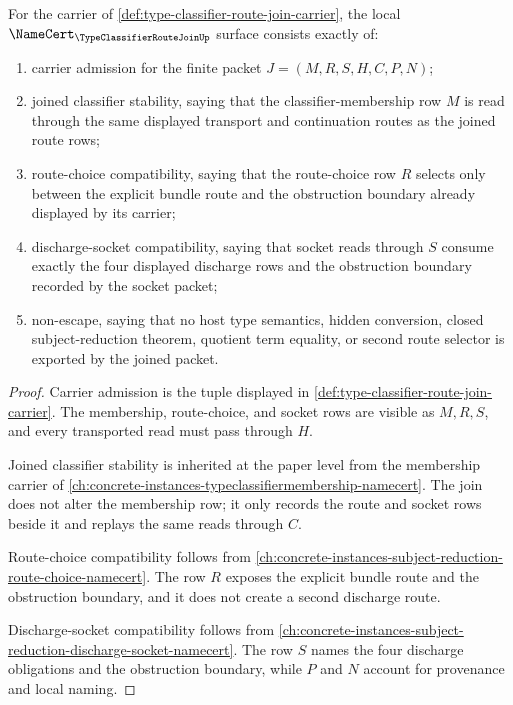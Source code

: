 \begin{theorem}
\label{thm:type-classifier-route-join-namecert-obligations}
For the carrier of \autoref{def:type-classifier-route-join-carrier}, the local $\NameCert_{\TypeClassifierRouteJoinUp}$ surface consists exactly of:
\begin{enumerate}
\item carrier admission for the finite packet $J=(M,R,S,H,C,P,N)$;
\item joined classifier stability, saying that the classifier-membership row $M$ is read through the same displayed transport and continuation routes as the joined route rows;
\item route-choice compatibility, saying that the route-choice row $R$ selects only between the explicit bundle route and the obstruction boundary already displayed by its carrier;
\item discharge-socket compatibility, saying that socket reads through $S$ consume exactly the four displayed discharge rows and the obstruction boundary recorded by the socket packet;
\item non-escape, saying that no host type semantics, hidden conversion, closed subject-reduction theorem, quotient term equality, or second route selector is exported by the joined packet.
\end{enumerate}
\end{theorem}
\begin{proof}
Carrier admission is the tuple displayed in \autoref{def:type-classifier-route-join-carrier}. The membership, route-choice, and socket rows are visible as $M,R,S$, and every transported read must pass through $H$.

Joined classifier stability is inherited at the paper level from the membership carrier of \autoref{ch:concrete-instances-typeclassifiermembership-namecert}. The join does not alter the membership row; it only records the route and socket rows beside it and replays the same reads through $C$.

Route-choice compatibility follows from \autoref{ch:concrete-instances-subject-reduction-route-choice-namecert}. The row $R$ exposes the explicit bundle route and the obstruction boundary, and it does not create a second discharge route.

Discharge-socket compatibility follows from \autoref{ch:concrete-instances-subject-reduction-discharge-socket-namecert}. The row $S$ names the four discharge obligations and the obstruction boundary, while $P$ and $N$ account for provenance and local naming.
\end{proof}

